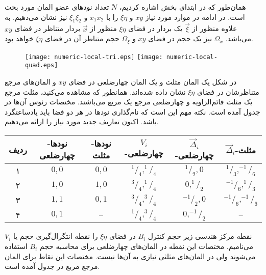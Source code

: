 همان‌طور که در ابتدای بخش  اشاره کردیم، $ٔN$ تعداد نود‌های عضو المان مورد بحث است. در ادامه در موارد مورد نیاز $xy$ و $\xi \eta$ را با $x_1x_2$ و $\xi_1 \xi_2$ نیز نشان می‌دهیم. به علاوه منظور از $\vec \xi$ یک بردار در فضای $\xi \eta$ منظور از $\vec x$ بردار متناظر در فضای $xy$ می‌باشد. $\Omega_x$ نیز یک حجم در فضای $xy$ و $\Omega_\xi$ حجم متناظر آن در فضای  $\xi \eta$ خواهد بود.

\begin{figure}[h]
\texttt{[image: numeric-local-tri.eps]} 
\texttt{[image: numeric-local-quad.eps]} 
\label{fig:3poly}
\end{figure}

در شکل  یک المان مثلث و یک المان چهارضلعی در فضای  $xy$ و المان‌های مرجع متناظرشان  در فضای  $\xi \eta$ نشان داده شده‌اند.  همانطور که مشاهده می‌کنید، مثلث مرجع یک مثلث قائم‌الزاویه و چهارضلعی مرجع یک مربع می‌باشند. مختصات رئوس آن‌ها در جدول  آمده است. نکته مهم این است که نام‌گذاری نود‌ها در هر دو فضا باید پادساعتگرد باشد. اکنون تعاریف جدید مورد نیاز را ارائه می‌دهیم.

\begin{table}
\centering
{}
\label{tab:3poly}
\begin{tabular}{| c | c | c | c | c | c |}
\hline
ردیف &نود‌ها-چهارضلعی & نودها-مثلث &$V_i$-چهارضلعی &$\vec \Delta_i$-چهارضلعی &$\vec \Delta_i$-مثلث \\
\hline
۱ &$0,0$ &$0,0$ &$^1/_4,^1/_4$ &$^1/_2,0$    &$^1/_3,^{-1}/_6$   \\
۲ &$1,0$ &$1,0$ &$^3/_4,^1/_4$ &$0,^1/_2$    &$^{-1}/_6,^1/_3$   \\
۳ &$1,1$ &$0,1$ &$^3/_4,^3/_4$ &$^{-1}/_2,0$ &$^{-1}/_6,^{-1}/_6$ \\
۴ &$0,1$ &-- &$^1/_4,^3/_4$ &$0,^{-1}/_2$ &-- \\
\hline
\end{tabular}
\end{table}

نقطه مرکز هندسی زیر حجم کنترل $B_i$ در فضای $\xi \eta$ را نقطه انتگرال‌گیری حجم یا $V_i$ می‌نامیم. مختصات این نقطه در المان‌های چهارضلعی برای محاسبه حجم $B_i$ استفاده می‌شوند ولی در المان‌های مثلثی نیازی به آن‌ها نیست. مختصات این نقاط برای المان مرجع مربع در جدول آمده‌ است.

